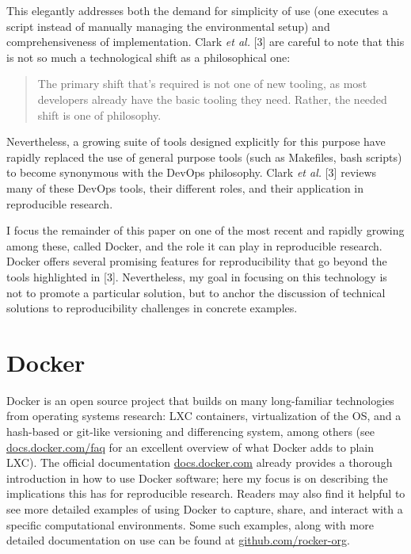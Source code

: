 \documentclass[9pt]{components/acm_proc_article-sp}
\begin{document}
This elegantly addresses both the demand for simplicity of use (one
executes a script instead of manually managing the environmental setup)
and comprehensiveness of implementation. Clark \emph{et al.} {[}3{]} are
careful to note that this is not so much a technological shift as a
philosophical one:

\begin{quote}
The primary shift that's required is not one of new tooling, as most
developers already have the basic tooling they need. Rather, the needed
shift is one of philosophy.
\end{quote}

Nevertheless, a growing suite of tools designed explicitly for this
purpose have rapidly replaced the use of general purpose tools (such as
Makefiles, bash scripts) to become synonymous with the DevOps
philosophy. Clark \emph{et al.} {[}3{]} reviews many of these DevOps
tools, their different roles, and their application in reproducible
research.

I focus the remainder of this paper on one of the most recent and
rapidly growing among these, called Docker, and the role it can play in
reproducible research. Docker offers several promising features for
reproducibility that go beyond the tools highlighted in {[}3{]}.
Nevertheless, my goal in focusing on this technology is not to promote a
particular solution, but to anchor the discussion of technical solutions
to reproducibility challenges in concrete examples.

\section{Docker}\label{docker}

Docker is an open source project that builds on many long-familiar
technologies from operating systems research: LXC containers,
virtualization of the OS, and a hash-based or git-like versioning and
differencing system, among others (see
\href{https://docs.docker.com/faq/\#what-does-docker-add-to-just-plain-lxc}{docs.docker.com/faq}
for an excellent overview of what Docker adds to plain LXC). The
official documentation \href{https://docs.docker.com}{docs.docker.com}
already provides a thorough introduction in how to use Docker software;
here my focus is on describing the implications this has for
reproducible research. Readers may also find it helpful to see more
detailed examples of using Docker to capture, share, and interact with a
specific computational environments. Some such examples, along with more
detailed documentation on use can be found at
\href{https://github.com/rocker-org/rocker}{github.com/rocker-org}.
\end{document}
